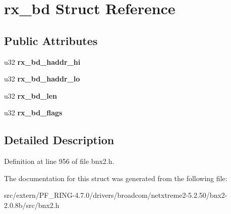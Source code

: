 \hypertarget{structrx__bd}{
\section{rx\_\-bd Struct Reference}
\label{structrx__bd}
}
\subsection*{Public Attributes}
\begin{DoxyCompactItemize}
\item 
\hypertarget{structrx__bd_ab8915932b1fca3155a02e3c83e6332ec}{
u32 {\bfseries rx\_\-bd\_\-haddr\_\-hi}}
\label{structrx__bd_ab8915932b1fca3155a02e3c83e6332ec}

\item 
\hypertarget{structrx__bd_abd4cdf79ff3a60f6786cef4c699a5cd8}{
u32 {\bfseries rx\_\-bd\_\-haddr\_\-lo}}
\label{structrx__bd_abd4cdf79ff3a60f6786cef4c699a5cd8}

\item 
\hypertarget{structrx__bd_a46a4a49378309d8aceaaa73a8b560435}{
u32 {\bfseries rx\_\-bd\_\-len}}
\label{structrx__bd_a46a4a49378309d8aceaaa73a8b560435}

\item 
\hypertarget{structrx__bd_ade161776db0844c4bfd20e0183a3743f}{
u32 {\bfseries rx\_\-bd\_\-flags}}
\label{structrx__bd_ade161776db0844c4bfd20e0183a3743f}

\end{DoxyCompactItemize}


\subsection{Detailed Description}


Definition at line 956 of file bnx2.h.



The documentation for this struct was generated from the following file:\begin{DoxyCompactItemize}
\item 
src/extern/PF\_\-RING-\/4.7.0/drivers/broadcom/netxtreme2-\/5.2.50/bnx2-\/2.0.8b/src/bnx2.h\end{DoxyCompactItemize}
